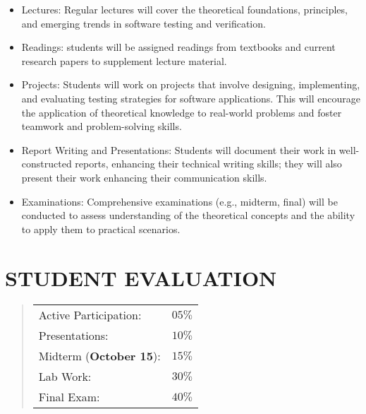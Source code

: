 \documentclass [11pt]{article}
\begin{document}
\begin{itemize}
 \item    Lectures:
        Regular lectures will cover the theoretical foundations, principles, and emerging trends in software testing and verification. 
        

 \item   Readings: students will be assigned readings from textbooks and current research papers to supplement lecture material.

 
  \item  Projects:
        Students will work on projects that involve designing, implementing, and evaluating testing strategies for software applications. This will encourage the application of theoretical knowledge to real-world problems and foster teamwork and problem-solving skills.
        
\item   Report Writing and Presentations: Students will document their work in well-constructed reports, enhancing their technical writing skills; they will also present their work enhancing their communication skills.      

  \item Examinations:
        Comprehensive examinations (e.g., midterm, final) will be conducted to assess understanding of the theoretical concepts and the ability to apply them to practical scenarios.
	
\end{itemize}
	
\section*{STUDENT EVALUATION}

  \begin{quote}
	\begin{tabular}{ll}
	Active Participation: & $05\%$\\
	Presentations: & $10\%$\\
	Midterm (\textbf{October 15}): & $15\%$\\
	Lab Work: & $30\%$\\
	Final Exam: & $40\%$\\
	\end{tabular}
	\end{quote}
 
\end{document}
